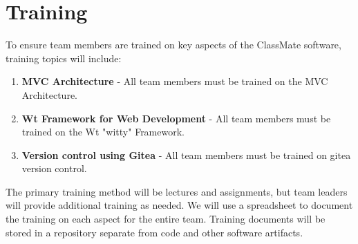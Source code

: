 \documentclass[letterpaper,12pt,oneside,listof=totoc]{scrreprt}
\begin{document}
\section{Training}
To ensure team members are trained on key aspects of the ClassMate software, training topics will include:
\begin{enumerate}
\item \textbf{MVC Architecture} - All team members must be trained on the MVC Architecture.
\item \textbf{Wt Framework for Web Development} - All team members must be trained on the Wt "witty" Framework.
\item \textbf{Version control using Gitea} - All team members must be trained on gitea version control.
\end{enumerate}

The primary training method will be lectures and assignments, but team leaders will provide additional training as needed.
We will use a spreadsheet to document the training on each aspect for the entire team. Training documents will be stored in a repository separate from code and other software artifacts.
\end{document}

